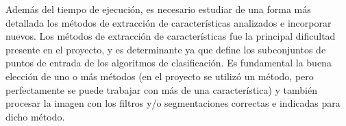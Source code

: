 \documentclass[10pt,a4paper]{article}
\begin{document}
Además del tiempo de ejecución, es necesario estudiar de una forma más detallada los métodos de extracción de características analizados e incorporar nuevos. Los métodos de extracción de características fue la principal dificultad presente en el proyecto, y es determinante ya que define los subconjuntos de puntos de entrada de los algoritmos de clasificación. Es fundamental la buena elección de uno o más métodos (en el proyecto se utilizó un método, pero perfectamente se puede trabajar con más de una característica) y también procesar la imagen con los filtros y/o segmentaciones correctas e indicadas para dicho método.

\printbibliography

\newpage
\tableofcontents
\end{document}
